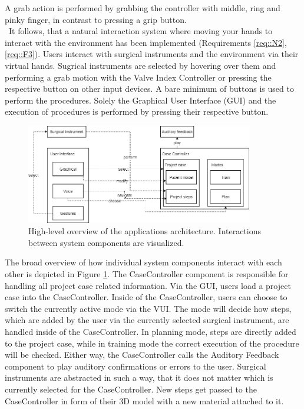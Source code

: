 A grab action is performed by grabbing the controller with middle, ring and pinky finger, in contrast to pressing a grip button.
\\ It follows, that a natural interaction system where moving your hands to interact with the environment has been implemented (Requirements \ref{req::N2}, \ref{req::F3}).
Users interact with surgical instruments and the environment via their virtual hands.
Sugrical instruments are selected by hovering over them and performing a grab motion with the Valve Index Controller or pressing the respective button on other input devices.
A bare minimum of buttons is used to perform the procedures.
Solely the Graphical User Interface (GUI) and the execution of procedures is performed by pressing their respective button.

\begin{figure}[ht]
    \centering
    \includegraphics[width=375px]{images/implementation/architecture.png}
    \caption{\label{fig::ImplementationArchitecture}High-level overview of the applications architecture. Interactions between system components are visualized.}
\end{figure}

The broad overview of how individual system components interact with each other is depicted in Figure \ref{fig::ImplementationArchitecture}.
The CaseController component is responsible for handling all project case related information.
Via the GUI, users load a project case into the CaseController.
Inside of the CaseController, users can choose to switch the currently active mode via the VUI.
The mode will decide how steps, which are added by the user via the currently selected surgical instrument, are handled inside of the CaseController.
In planning mode, steps are directly added to the project case, while in training mode the correct execution of the procedure will be checked.
Either way, the CaseController calls the Auditory Feedback component to play auditory confirmations or errors to the user.
Surgical instruments are abstracted in such a way, that it does not matter which is currently selected for the CaseController.
New steps get passed to the CaseController in form of their 3D model with a new material attached to it.

